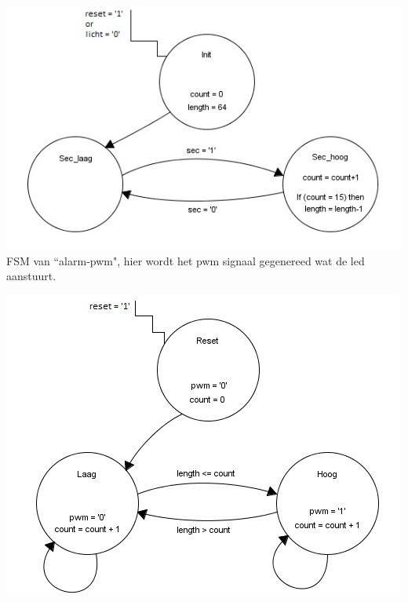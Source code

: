 \includegraphics[width=\textwidth,height=\textheight,keepaspectratio]{Figuren/Alarm/FSM_count.jpg}
\newpage
FSM van ``alarm-pwm", hier wordt het pwm signaal gegenereed wat de led aanstuurt.

\includegraphics[width=\textwidth,height=\textheight,keepaspectratio]{Figuren/Alarm/FSM_PWM.jpg}
